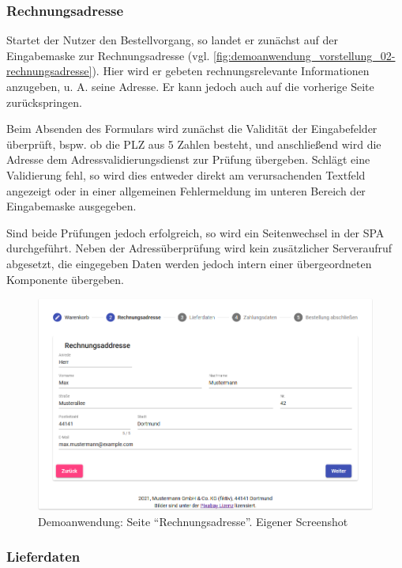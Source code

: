 \subsubsection{Rechnungsadresse}

Startet der Nutzer den Bestellvorgang, so landet er zunächst auf der Eingabemaske zur Rechnungsadresse (vgl. \autoref{fig:demoanwendung_vorstellung_02-rechnungsadresse}). Hier wird er gebeten rechnungsrelevante Informationen anzugeben, u. A. seine Adresse. Er kann jedoch auch auf die vorherige Seite zurückspringen.

Beim Absenden des Formulars wird zunächst die Validität der Eingabefelder überprüft, bspw. ob die PLZ aus 5 Zahlen besteht, und anschließend wird die Adresse dem Adressvalidierungsdienst zur Prüfung übergeben. Schlägt eine Validierung fehl, so wird dies entweder direkt am verursachenden Textfeld angezeigt oder in einer allgemeinen Fehlermeldung im unteren Bereich der Eingabemaske ausgegeben.

Sind beide Prüfungen jedoch erfolgreich, so wird ein Seitenwechsel in der SPA durchgeführt. Neben der Adressüberprüfung wird kein zusätzlicher Serveraufruf abgesetzt, die eingegeben Daten werden jedoch intern einer übergeordneten Komponente übergeben.

\begin{figure}[H]
	\centering
	\includegraphics[width=1.00\linewidth]{img/04_erstellung-poc/demoanwendung_vorstellung_02-rechnungsadresse.png}
	\caption{Demoanwendung: Seite \enquote{Rechnungsadresse}. Eigener Screenshot}
	\label{fig:demoanwendung_vorstellung_02-rechnungsadresse}
\end{figure}

\newpage

\subsubsection{Lieferdaten}

